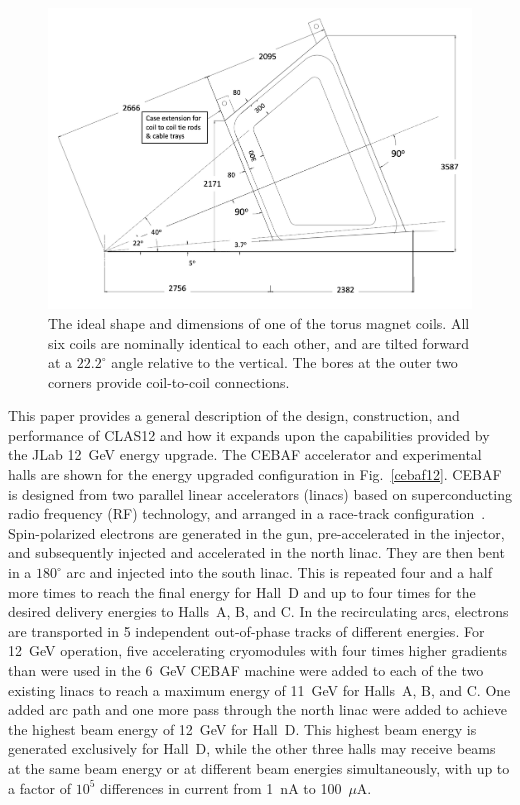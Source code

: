 \documentclass[final,3p,twocolumn]{elsarticle}
\begin{document}
\begin{figure}[tbp!]
\centerline{\includegraphics[width=1.50\columnwidth]{clas12_desired.png}}
\caption{The ideal shape and dimensions of one of the torus magnet coils. All six coils are nominally identical to each
other, and are tilted forward at a $22.2^\circ$ angle relative to the vertical. The bores at the outer two corners
provide coil-to-coil connections.}
\label{coil-shape}
\end{figure}
This paper provides a general description of the design, construction, and performance of CLAS12 and how it expands
upon the capabilities provided by the JLab 12~GeV energy upgrade. The CEBAF accelerator and experimental halls
are shown for the energy upgraded configuration in Fig.~\ref{cebaf12}. CEBAF is designed from two parallel linear
accelerators (linacs) based on superconducting radio frequency (RF) technology, and arranged in a race-track
configuration~\cite{Leemann:2001dg}. Spin-polarized electrons are generated in the gun, pre-accelerated in the
injector, and subsequently injected and accelerated in the north linac. They are then bent in a $180^\circ$ arc and
injected into the south linac. This is repeated four and a half more times to reach the final energy for Hall~D and up to
four times  for the desired delivery energies to Halls~A, B, and C. In the recirculating arcs, electrons are transported
in 5 independent out-of-phase tracks of different energies. For 12~GeV operation, five accelerating cryomodules with
four times higher gradients than were used in the 6~GeV CEBAF machine were added to each of the two existing linacs
to reach a maximum energy of 11~GeV for Halls~A, B, and C. One added arc path and one more pass through the north
linac were added to achieve the highest beam energy of 12~GeV for Hall~D. This highest beam energy is generated
exclusively for Hall~D, while the other three halls may receive beams at the same beam energy or at different beam
energies simultaneously, with up to a factor of $10^5$ differences in current from 1~nA to 100~$\mu$A.
\end{document}
